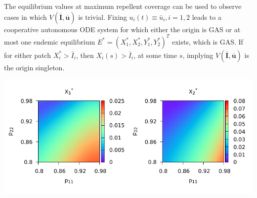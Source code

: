 \documentclass[a1paper,portrait,fontscale=0.45]{baposter}
\begin{document}
\begin{poster}
{    The equilibrium values at maximum repellent coverage can be used to observe cases in which $V(\overline{\mathbf{I}}, \overline{\mathbf{u}})$ is trivial.
    Fixing $u_i (t) \equiv \bar{u}_i, i=1,2$ leads to a cooperative autonomous ODE system for which either the origin is GAS or at most one endemic equilibrium $E^*=(X_1^*, X_2^*, Y_1^*, Y_2^*)^T$ exists, which is GAS.
    If for either patch $X_i^*>\bar{I}_i$, then $X_i(s) > \bar{I}_i$, at some time $s$, implying $V(\overline{\mathbf{I}}, \overline{\mathbf{u}})$ is the origin singleton.
    \begin{center}
      \includegraphics[width=0.7\linewidth]{equilibrium2.pdf}
    \end{center}

  }





\end{poster}
\end{document}
